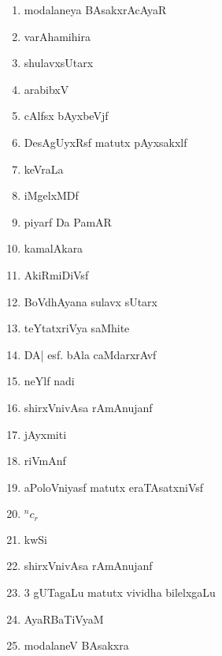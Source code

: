 \begin{enumerate}
\item modalaneya BAsakxrAcAyaR

\item varAhamihira

\item shulavxsUtarx

\item arabibxV

\item cAlfsx bAyxbeVjf

\item DesAgUyxRsf matutx pAyxsakxlf

\item keVraLa

\item iMgelxMDf

\item piyarf Da PamAR

\item kamalAkara

\item AkiRmiDiVsf

\item BoVdhAyana sulavx sUtarx

\item teYtatxriVya saMhite

\item DA| esf. bAla caMdarxrAvf

\item neYlf nadi

\item shirxVnivAsa rAmAnujanf

\item jAyxmiti

\item riVmAnf

\item aPoloVniyasf matutx eraTAsatxniVsf

\item ${}^nc_r$

\item kwSi

\item shirxVnivAsa rAmAnujanf

\item $3$ gUTagaLu matutx vividha bilelxgaLu

\item AyaRBaTiVyaM

\item modalaneV BAsakxra


\end{enumerate}

